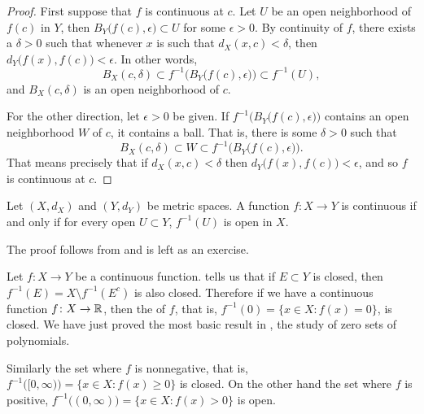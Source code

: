 \begin{proof}
First suppose that $f$ is continuous at $c$.
Let $U$ be an open neighborhood of $f(c)$
in $Y$, then $B_Y\bigl(f(c),\epsilon\bigr) \subset U$ for some $\epsilon >
0$.  By continuity of $f$, there exists a $\delta > 0$
such that whenever $x$ is such that $d_X(x,c) < \delta$, then
$d_Y\bigl(f(x),f(c)\bigr) < \epsilon$.  In other words,
\begin{equation*}
B_X(c,\delta) \subset f^{-1}\bigl(B_Y\bigl(f(c),\epsilon\bigr)\bigr) \subset
f^{-1}(U) ,
\end{equation*}
and $B_X(c,\delta)$ is an open neighborhood of $c$.

For the other direction,
let $\epsilon > 0$ be given.  If
$f^{-1}\bigl(B_Y\bigl(f(c),\epsilon\bigr)\bigr)$ contains an open
neighborhood $W$ of $c$, it contains a ball.  That is, there is some $\delta > 0$
such that
\begin{equation*}
B_X(c,\delta) \subset W \subset f^{-1}\bigl(B_Y\bigl(f(c),\epsilon\bigr)\bigr) .
\end{equation*}
That means precisely that if $d_X(x,c) < \delta$ then $d_Y\bigl(f(x),f(c)\bigr)
< \epsilon$, and so $f$ is continuous at $c$.
\end{proof}

\begin{thm} \label{thm:mstopocont}
Let $(X,d_X)$ and $(Y,d_Y)$ be metric spaces.  A function $f \colon X \to Y$
is continuous if and only if
for every open $U \subset Y$, $f^{-1}(U)$ is open in $X$.
\end{thm}

The proof follows from  and is left as
an exercise.

\begin{example}
Let $f \colon X \to Y$ be a continuous function.
 tells us that if $E \subset Y$ is closed, then 
$f^{-1}(E) = X \setminus f^{-1}(E^c)$ is also closed.  Therefore if
we have a continuous
function $f \colon X \to {\mathbb{R}}$, then the
\emph{} of $f$, that is, 
$f^{-1}(0) = \{ x \in X :
f(x) = 0 \}$, is closed.  We have just proved the most basic result in
\emph{}, the study of
zero sets of polynomials.

Similarly the set where $f$ is nonnegative, that is,
$f^{-1}\bigl( [0,\infty) \bigr) = \{ x \in X :
f(x) \geq 0 \}$ is closed.  On the other hand the
set where $f$ is positive,
$f^{-1}\bigl( (0,\infty) \bigr) = \{ x \in X :
f(x) > 0 \}$ is open.  
\end{example}

